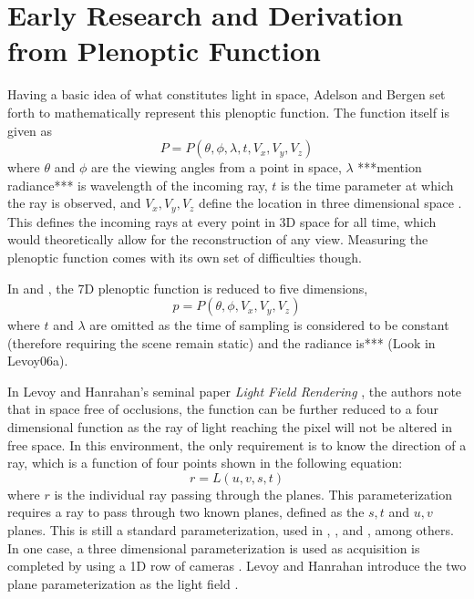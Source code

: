 \documentclass[12pt]{report}
\begin{document}
\section*{Early Research and Derivation from Plenoptic Function}
Having a basic idea of what constitutes light in space, Adelson and Bergen set forth to mathematically represent this plenoptic function.
The function itself is given as 
\begin{equation}
P=P(\theta,\phi,\lambda,t,V_x, V_y,V_z)
\end{equation}
where $\theta$ and $\phi$ are the viewing angles from a point in space, $\lambda$ ***mention radiance*** is wavelength of the incoming ray, $t$ is the time parameter at which the ray is observed, and $V_x,V_y,V_z$ define the location in three dimensional space \cite{Adelson91}. This defines the incoming rays at every point in 3D space for all time, which would theoretically allow for the reconstruction of any view. Measuring the plenoptic function comes with its own set of difficulties though.

In \cite{McMillan95} and \cite{Huang14}, the 7D plenoptic function is reduced to five dimensions,
\begin{equation}
p=P(\theta,\phi,V_x,V_y,V_z)
\end{equation}
where $t$ and $\lambda$ are omitted as the time of sampling is considered to be constant (therefore requiring the scene remain static) and the radiance is*** (Look in Levoy06a). 

In Levoy and Hanrahan's seminal paper \emph{Light Field Rendering} \cite{Levoy96}, the authors note that in space free of occlusions, the function can be further reduced to a four dimensional function as the ray of light reaching the pixel will not be altered in free space. In this environment, the only requirement is to know the direction of a ray, which is a function of four points shown in the following equation:
\begin{equation}
r=L(u,v,s,t)
\end{equation}
where $r$ is the individual ray passing through the planes. This parameterization requires a ray to pass through two known planes, defined as the $s,t$ and $u,v$ planes. This is  still a standard parameterization, used in \cite{Isaksen01}, \cite{Vaish06}, and \cite{Oberlin16}, among others. In one case, a three dimensional parameterization is used as acquisition is completed by using a 1D row of cameras \cite{Kim13}. Levoy and Hanrahan introduce the two plane parameterization as the light field \cite{Levoy96}.
\end{document}
